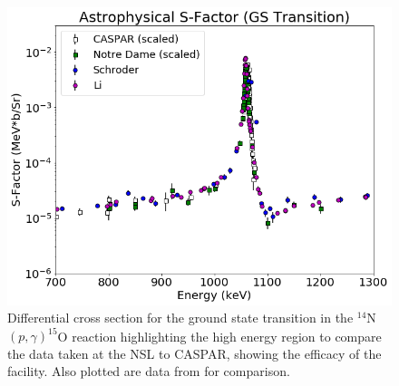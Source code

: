 \begin{figure}
		\includegraphics[width=1.0\linewidth]{figures/highCompareGS.png}
	\caption{Differential cross section for the ground state transition in the $^{14}$N$\left( p,\gamma \right) ^{15}$O reaction highlighting the high energy region to compare the data taken at the NSL to CASPAR, showing the efficacy of the facility. Also plotted are data from \cite{Schroder1987, Li2016} for comparison.  }
	\label{fig: highCompareGS}
\end{figure}



